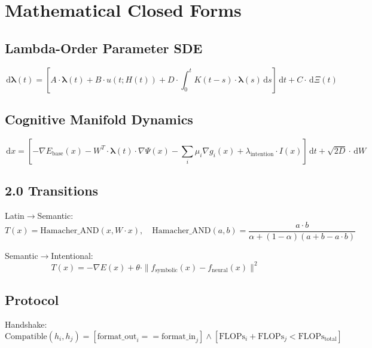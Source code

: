 \documentclass[11pt,a4paper]{article}
\theoremstyle{definition}
\theoremstyle{remark}
\newcommand{\CML}{\text{CML 2.0}}
\newcommand{\GWP}{\text{GWP}}
\newcommand{\lambdavec}{\boldsymbol{\lambda}}
\newcommand{\diff}{\,\mathrm{d}}
\begin{document}
\section{Mathematical Closed Forms}\label{app:math}

\subsection{Lambda-Order Parameter SDE}\label{app:lambda-sde}
\begin{equation}
\diff\lambdavec(t) = \left[A \cdot \lambdavec(t) + B \cdot u(t; H(t)) + D \cdot \int_0^t K(t-s) \cdot \lambdavec(s) \diff s\right]\diff t + C \cdot \diff\Xi(t)
\end{equation}

\subsection{Cognitive Manifold Dynamics}\label{app:manifold}
\begin{equation}
\diff x = \left[-\nabla E_{\text{base}}(x) - W^T \cdot \lambdavec(t) \cdot \nabla \Psi(x) - \sum_i \mu_i \nabla g_i(x) + \lambda_{\text{intention}} \cdot I(x)\right]\diff t + \sqrt{2D} \cdot \diff W
\end{equation}

\subsection{\CML{} 2.0 Transitions}\label{app:cml-transitions}

Latin$\rightarrow$Semantic:
\begin{equation}
T(x) = \text{Hamacher\_AND}(x, W \cdot x), \quad \text{Hamacher\_AND}(a, b) = \frac{a \cdot b}{\alpha + (1-\alpha)(a + b - a \cdot b)}
\end{equation}

Semantic$\rightarrow$Intentional:
\begin{equation}
T(x) = -\nabla E(x) + \theta \cdot \|f_{\text{symbolic}}(x) - f_{\text{neural}}(x)\|^2
\end{equation}

\subsection{\GWP{} Protocol}\label{app:gwp}

Handshake:
\begin{equation}
\text{Compatible}(h_i, h_j) = [\text{format\_out}_i == \text{format\_in}_j] \land [\text{FLOPs}_i + \text{FLOPs}_j < \text{FLOPs}_{\text{total}}]
\end{equation}
\end{document}
